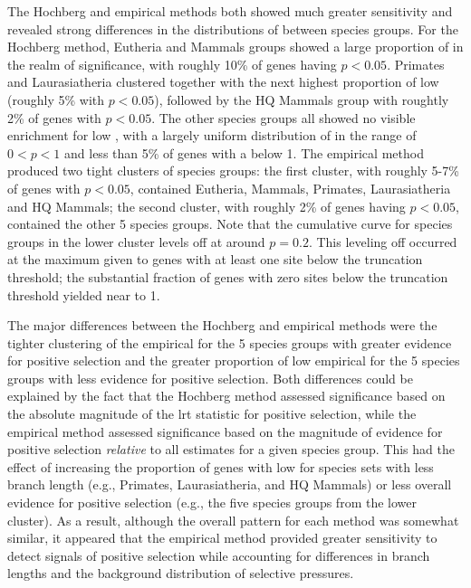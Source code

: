 The Hochberg and empirical methods both showed much greater
sensitivity and revealed strong differences in the distributions of
\pvs between species groups. For the Hochberg method, Eutheria and
Mammals groups showed a large proportion of \pvs in the realm of
significance, with roughly 10\% of genes having $p<0.05$. Primates and
Laurasiatheria clustered together with the next highest proportion of
low \pvs (roughly 5\% with $p<0.05$), followed by the HQ Mammals
group with roughtly 2\% of genes with $p<0.05$. The other species
groups all showed no visible enrichment for low \pvs, with a
largely uniform distribution of \pvs in the range of $0<p<1$ and
less than 5\% of genes with a \pv below 1. The empirical method
produced two tight clusters of species groups: the first cluster, with
roughly 5-7\% of genes with $p<0.05$, contained Eutheria, Mammals,
Primates, Laurasiatheria and HQ Mammals; the second cluster, with
roughly 2\% of genes having $p<0.05$, contained the other 5 species
groups. Note that the cumulative curve for species groups in the lower
cluster levels off at around $p=0.2$. This leveling off occurred at
the maximum \pv given to genes with at least one site below the
truncation threshold; the substantial fraction of genes with zero
sites below the truncation threshold yielded \pvs near to 1.

The major differences between the Hochberg and empirical methods were
the tighter clustering of the empirical \pvs for the 5 species
groups with greater evidence for positive selection and the greater
proportion of low empirical \pvs for the 5 species groups with
less evidence for positive selection. Both differences could be
explained by the fact that the Hochberg method assessed significance
based on the absolute magnitude of the \ac{lrt} statistic for positive
selection, while the empirical method assessed significance based on
the magnitude of evidence for positive selection \emph{relative} to
all \sw estimates for a given species group. This had the effect of
increasing the proportion of genes with low \pvs for species sets
with less branch length (e.g., Primates, Laurasiatheria, and HQ
Mammals) or less overall evidence for positive selection (e.g., the
five species groups from the lower cluster). As a result, although the
overall pattern for each method was somewhat similar, it appeared that
the empirical method provided greater sensitivity to detect signals of
positive selection while accounting for differences in branch lengths
and the background distribution of \sw selective pressures.

